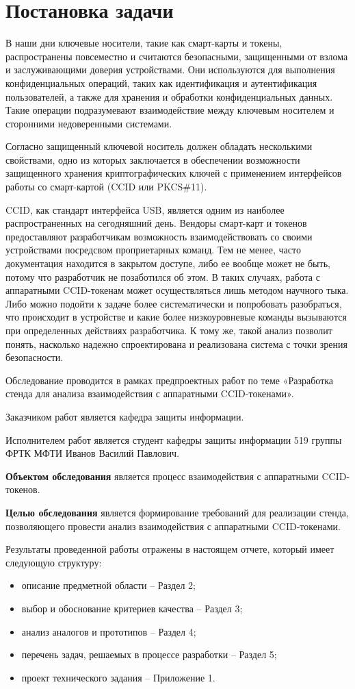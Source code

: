 \section{Постановка задачи}

В наши дни ключевые носители, такие как смарт-карты и токены, распространены повсеместно и считаются безопасными, защищенными от взлома и
заслуживающими доверия устройствами. Они используются для выполнения конфиденциальных операций,
таких как идентификация и аутентификация пользователей, а также для хранения и обработки конфиденциальных данных.
Такие операции подразумевают взаимодействие между ключевым носителем и сторонними недоверенными системами.

Согласно \cite[c.~159]{dit} защищенный ключевой носитель должен обладать несколькими свойствами, одно из которых заключается в обеспечении
возможности защищенного хранения криптографических ключей с применением интерфейсов работы со смарт-картой (CCID или PKCS\#11).

CCID, как стандарт интерфейса USB, является одним из наиболее распространенных на сегодняшний день\cite{iccid}.
Вендоры смарт-карт и токенов предоставляют разработчикам возможность взаимодействовать со своими устройствами посредсвом проприетарных
команд. Тем не менее, часто документация находится в закрытом доступе, либо ее вообще может не быть, потому что разработчик
не позаботился об этом. В таких случаях, работа с аппаратными CCID-токенам может осуществляться лишь методом научного тыка. Либо можно подойти
к задаче более систематически и попробовать разобраться, что происходит в устройстве и какие более низкоуровневые команды вызываются при
определенных действиях разработчика. К тому же, такой анализ позволит понять, насколько надежно спроектирована и реализована система
с точки зрения безопасности.

Обследование проводится в рамках предпроектных работ по теме «Разработка стенда для анализа взаимодействия с аппаратными CCID-токенами».

Заказчиком работ является кафедра защиты информации.

Исполнителем работ является студент кафедры защиты информации 519 группы
ФРТК МФТИ Иванов Василий Павлович.

\textbf{Объектом обследования} является процесс взаимодействия с аппаратными CCID-токенов.

\textbf{Целью обследования} является формирование требований для реализации
стенда, позволяющего провести анализ взаимодействия с аппаратными CCID-токенами.

Результаты проведенной работы отражены в настоящем отчете, который имеет
следующую структуру:
\begin{itemize}
  \item описание предметной области – Раздел 2;
  \item выбор и обоснование критериев качества – Раздел 3;
  \item анализ аналогов и прототипов – Раздел 4;
  \item перечень задач, решаемых в процессе разработки – Раздел 5;
  \item проект технического задания – Приложение 1.
\end{itemize}

\clearpage